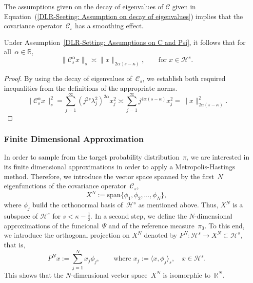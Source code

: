 The assumptions given on the decay of eigenvalues of $\mathcal{C}$ given in Equation~(\ref{DLR-Seeting: Assumption on decay of eigenvalues}) implies that the covariance operator~$\mathcal{C}_s$ has a smoothing effect.

\begin{lemma}\autocite[Lemma 3.3]{Mattingly2010}
\label{DLR-Setting: Smoothing effect of C}
 Under Assumption~\ref{DLR-Setting: Assumptions on C and Psi}, it follows that for all~$\alpha \in \mathbb{R}$,
 \begin{equation}
   \| \mathcal{C}_s^{\alpha} x \|_{s} \asymp \| x \|_{2 \alpha (s - \kappa)}, \qquad \text{for } x \in \mathcal{H}^s.
 \end{equation}
 
\end{lemma}

\begin{proof}
 By using the decay of eigenvalues of~$\mathcal{C}_s$, we establish both required inequalities from the definitions of the appropriate norms.
 \begin{equation*}
   \| \mathcal{C}_s^{\alpha} x \|_{s}^2 = \sum_{j=1}^{\infty} (j^{2 s} \lambda_j^2)^{2 \alpha} x_j^2 \asymp  \sum_{j=1}^{\infty} j^{4 \alpha (s - \kappa)} x_j^2 = \| x \|_{ 2 \alpha ( s - \kappa)}^2.
 \end{equation*}

\end{proof}


\subsubsection{Finite Dimensional Approximation}

In order to sample from the target probability distribution~$\pi$, we are interested in its finite dimensional approximations in order to apply a Metropolis-Hastings method. Therefore, we introduce the vector space spanned by the first~$N$ eigenfunctions of the covariance operator~$\mathcal{C}_s$,
\begin{equation}
 X^N := \text{span} \{ \phi_1, \phi_2, \dots , \phi_N \},
\end{equation}
where $\phi_j$ build the orthonormal basis of~$\mathcal{H}^s$ as mentioned above. Thus, $X^N$ is a subspace of $\mathcal{H}^s$ for $s < \kappa - \tfrac{1}{2}$. In a second step, we define the $N$-dimensional approximations of the funcional~$\Psi$ and of the reference measure~$\pi_0$. To this end, we introduce the orthogonal projection on $X^N$ denoted by $P^N : \mathcal{H}^s \to X^N \subset \mathcal{H}^s$, that is,
\begin{equation}
  \label{DLR: Finite dimensional approximation - definition projection}
 P^N x := \sum_{j=1}^N  x_j \phi_j, \qquad \text{where } x_j := \langle x, \phi_j\rangle_s, \quad x \in \mathcal{H}^s.
\end{equation}
This shows that the $N$-dimensional vector space~$X^N$ is isomorphic to~$\mathbb{R}^N$.

